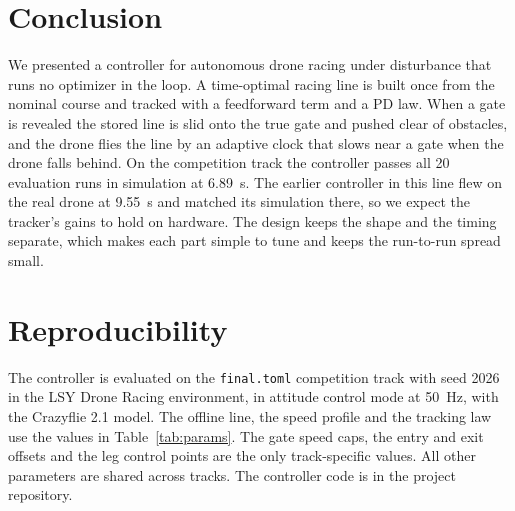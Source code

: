 \documentclass[conference]{IEEEtran}
\begin{document}
\section{Conclusion}
We presented a controller for autonomous drone racing under disturbance that runs no optimizer in the loop. A time-optimal racing line is built once from the nominal course and tracked with a feedforward term and a PD law. When a gate is revealed the stored line is slid onto the true gate and pushed clear of obstacles, and the drone flies the line by an adaptive clock that slows near a gate when the drone falls behind. On the competition track the controller passes all 20 evaluation runs in simulation at 6.89~s. The earlier controller in this line flew on the real drone at 9.55~s and matched its simulation there, so we expect the tracker's gains to hold on hardware. The design keeps the shape and the timing separate, which makes each part simple to tune and keeps the run-to-run spread small.

\appendices
\section{Reproducibility}
The controller is evaluated on the \texttt{final.toml} competition track with seed 2026 in the LSY Drone Racing environment, in attitude control mode at 50~Hz, with the Crazyflie 2.1 model. The offline line, the speed profile and the tracking law use the values in Table~\ref{tab:params}. The gate speed caps, the entry and exit offsets and the leg control points are the only track-specific values. All other parameters are shared across tracks. The controller code is in the project repository.
\end{document}
